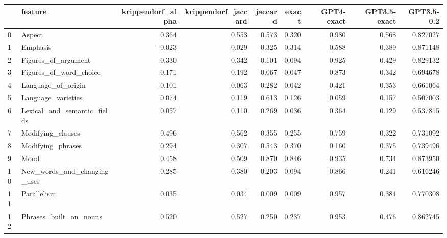 \begin{tabular}{llrrrrrrr}
\toprule
{} &                      feature &  krippendorf\_alpha &  krippendorf\_jaccard &  jaccard &  exact &  GPT4-exact &  GPT3.5-exact &  GPT3.5-0.2 \\
\midrule
0  &                       Aspect &              0.364 &                0.553 &    0.573 &  0.320 &       0.980 &         0.568 &    0.827027 \\
1  &                     Emphasis &             -0.023 &               -0.029 &    0.325 &  0.314 &       0.588 &         0.389 &    0.871148 \\
2  &          Figures\_of\_argument &              0.330 &                0.342 &    0.101 &  0.094 &       0.925 &         0.429 &    0.829132 \\
3  &       Figures\_of\_word\_choice &              0.171 &                0.192 &    0.067 &  0.047 &       0.873 &         0.342 &    0.694678 \\
4  &           Language\_of\_origin &             -0.101 &               -0.063 &    0.282 &  0.042 &       0.421 &         0.353 &    0.661064 \\
5  &           Language\_varieties &              0.074 &                0.119 &    0.613 &  0.126 &       0.059 &         0.157 &    0.507003 \\
6  &  Lexical\_and\_semantic\_fields &              0.057 &                0.110 &    0.269 &  0.036 &       0.364 &         0.129 &    0.537815 \\
7  &            Modifying\_clauses &              0.496 &                0.562 &    0.355 &  0.255 &       0.759 &         0.322 &    0.731092 \\
8  &            Modifying\_phrases &              0.294 &                0.307 &    0.543 &  0.370 &       0.160 &         0.375 &    0.739496 \\
9  &                         Mood &              0.458 &                0.509 &    0.870 &  0.846 &       0.935 &         0.734 &    0.873950 \\
10 &  New\_words\_and\_changing\_uses &              0.285 &                0.380 &    0.203 &  0.094 &       0.866 &         0.241 &    0.616246 \\
11 &                  Parallelism &              0.035 &                0.034 &    0.009 &  0.009 &       0.957 &         0.384 &    0.770308 \\
12 &       Phrases\_built\_on\_nouns &              0.520 &                0.527 &    0.250 &  0.237 &       0.953 &         0.476 &    0.862745 \\

\end{tabular}
